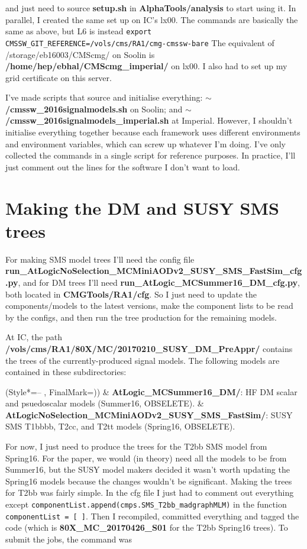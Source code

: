 and just need to source \textbf{setup.sh} in \textbf{AlphaTools/analysis} to start using it. In parallel, I created the same set up on IC's lx00. The commands are basically the same as above, but L6 is instead \texttt{export CMSSW\_GIT\_REFERENCE=/vols/cms/RA1/cmg-cmssw-bare} The equivalent of /storage/eb16003/CMScmg/ on Soolin is \textbf{/home/hep/ebhal/CMScmg\_imperial/} on lx00. I also had to set up my grid certificate on this server.

I've made scripts that source and initialise everything: \textbf{$\sim$/cmssw\_2016signalmodels.sh} on Soolin; and \textbf{$\sim$/cmssw\_2016signalmodels\_imperial.sh} at Imperial. However, I shouldn't initialise everything together because each framework uses different environments and environment variables, which can screw up whatever I'm doing. I've only collected the commands in a single script for reference purposes. In practice, I'll just comment out the lines for the software I don't want to load.


\section{Making the DM and SUSY SMS trees}

For making SMS model trees I'll need the config file \textbf{run\_AtLogicNoSelection\_MCMiniAODv2\_SUSY\_SMS\_FastSim\_cfg.py}, and for DM trees I'll need \textbf{run\_AtLogic\_MCSummer16\_DM\_cfg.py}, both located in \textbf{CMGTools/RA1/cfg}. So I just need to update the components/models to the latest versions, make the component lists to be read by the configs, and then run the tree production for the remaining models.

At IC, the path \textbf{/vols/cms/RA1/80X/MC/20170210\_SUSY\_DM\_PreAppr/} contains the trees of the currently-produced signal models. The following models are contained in these subdirectories:

\begin{easylist}
\ListProperties(Style*=-- , FinalMark={)})
& \textbf{AtLogic\_MCSummer16\_DM/}: HF DM scalar and psuedoscalar models (Summer16, OBSELETE).
& \textbf{AtLogicNoSelection\_MCMiniAODv2\_SUSY\_SMS\_FastSim/}: SUSY SMS T1bbbb, T2cc, and T2tt models (Spring16, OBSELETE).
\end{easylist}

For now, I just need to produce the trees for the T2bb SMS model from Spring16. For the paper, we would (in theory) need all the models to be from Summer16, but the SUSY model makers decided it wasn't worth updating the Spring16 models because the changes wouldn't be significant. Making the trees for T2bb was fairly simple. In the cfg file I just had to comment out everything except \verb!componentList.append(cmps.SMS_T2bb_madgraphMLM)! in the function \texttt{componentList = [ ]}. Then I recompiled, committed everything and tagged the code (which is \textbf{80X\_MC\_20170426\_S01} for the T2bb Spring16 trees). To submit the jobs, the command was

